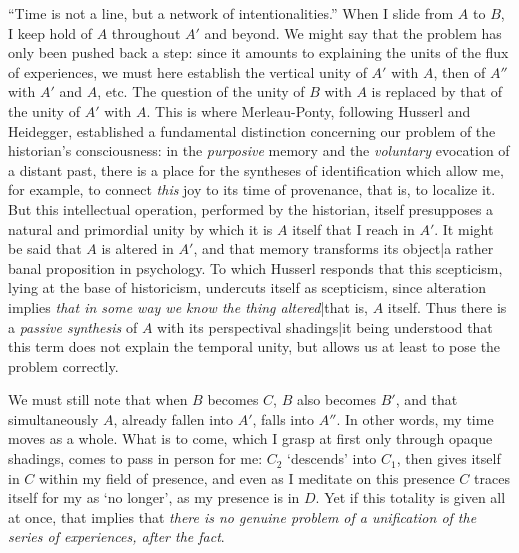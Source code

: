 \documentclass{scrartcl}
\begin{document}
	{\small ``Time is not a line, but a network of intentionalities.'' When I slide from $A$ to $B$, I keep hold of $A$ throughout $A'$ and beyond. We might say that the problem has only been pushed back a step: since it amounts to explaining the units of the flux of experiences, we must here establish the vertical unity of $A'$ with $A$, then of $A''$ with $A'$ and $A$, etc. The question of the unity of $B$ with $A$ is replaced by that of the unity of $A'$ with $A$. This is where Merleau-Ponty, following Husserl and Heidegger, established a fundamental distinction concerning our problem of the historian's consciousness: in the \textit{purposive} memory and the \textit{voluntary} evocation of a distant past, there is a place for the syntheses of identification which allow me, for example, to connect \textit{this} joy to its time of provenance, that is, to localize it. But this intellectual operation, performed by the historian, itself presupposes a natural and primordial unity by which it is $A$ itself that I reach in $A'$. It might be said that $A$ is altered in $A'$, and that memory transforms its object|a rather banal proposition in psychology. To which Husserl responds that this scepticism, lying at the base of historicism, undercuts itself as scepticism, since alteration implies \textit{that in some way we know the thing altered}|that is, $A$ itself. Thus there is a \textit{passive synthesis} of $A$ with its perspectival shadings|it being understood that this term does not explain the temporal unity, but allows us at least to pose the problem correctly.}
	
	{\small We must still note that when $B$ becomes $C$, $B$ also becomes $B'$, and that simultaneously $A$, already fallen into $A'$, falls into $A''$. In other words, my time moves as a whole. What is to come, which I grasp at first only through opaque shadings, comes to pass in person for me: $C_2$ `descends' into $C_1$, then gives itself in $C$ within my field of presence, and even as I meditate on this presence $C$ traces itself for my as `no longer', as my presence is in $D$. Yet if this totality is given all at once, that implies that \textit{there is no genuine problem of a unification of the series of experiences, after the fact}.}
	
\end{document}
